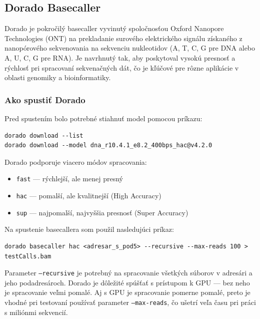 \subsection{Dorado Basecaller}

Dorado je pokročilý basecaller vyvinutý spoločnosťou Oxford Nanopore Technologies (ONT) na prekladanie surového elektrického signálu získaného z nanopórového sekvenovania na sekvenciu nukleotidov (A, T, C, G pre DNA alebo A, U, C, G pre RNA).
Je navrhnutý tak, aby poskytoval vysokú presnosť a rýchlosť pri spracovaní sekvenačných dát, čo je kľúčové pre rôzne aplikácie v oblasti genomiky a bioinformatiky.

\subsubsection{Ako spustiť Dorado}


Pred spustením bolo potrebné stiahnuť model pomocou príkazu:
\begin{verbatim}
dorado download --list
dorado download --model dna_r10.4.1_e8.2_400bps_hac@v4.2.0
\end{verbatim}


Dorado podporuje viacero módov spracovania:
\begin{itemize}
    \item \texttt{fast} — rýchlejší, ale menej presný
    \item \texttt{hac} — pomalší, ale kvalitnejší (High Accuracy)
    \item \texttt{sup} — najpomalší, najvyššia presnosť (Super Accuracy)
\end{itemize}

Na spustenie basecallera som použil nasledujúci príkaz:
\begin{verbatim}
dorado basecaller hac <adresar_s_pod5> --recursive --max-reads 100 > testCalls.bam
\end{verbatim}


Parameter \texttt{--recursive} je potrebný na spracovanie všetkých súborov v adresári a jeho podadresároch.
Dorado je dôležité spúšťať s prístupom k GPU — bez neho je spracovanie veľmi pomalé. Aj s GPU je spracovanie pomerne pomalé, preto je vhodné pri testovaní používať parameter \texttt{--max-reads}, čo ušetrí veľa času pri práci s miliónmi sekvencií.

\cite{DoradoDocs}
